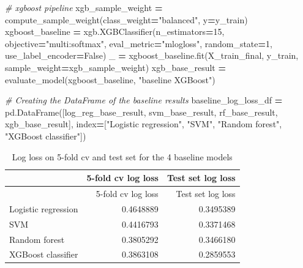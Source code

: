 \documentclass[a4paper, oneside]{report}
\newenvironment{Shaded}{\begin{snugshade}}{\end{snugshade}}
\newcommand{\AttributeTok}[1]{\textcolor[rgb]{0.77,0.63,0.00}{#1}}
\newcommand{\CommentTok}[1]{\textcolor[rgb]{0.56,0.35,0.01}{\textit{#1}}}
\newcommand{\DecValTok}[1]{\textcolor[rgb]{0.00,0.00,0.81}{#1}}
\newcommand{\FunctionTok}[1]{\textcolor[rgb]{0.00,0.00,0.00}{#1}}
\newcommand{\NormalTok}[1]{#1}
\newcommand{\OperatorTok}[1]{\textcolor[rgb]{0.81,0.36,0.00}{\textbf{#1}}}
\newcommand{\SpecialCharTok}[1]{\textcolor[rgb]{0.00,0.00,0.00}{#1}}
\newcommand{\StringTok}[1]{\textcolor[rgb]{0.31,0.60,0.02}{#1}}
\newcommand{\VariableTok}[1]{\textcolor[rgb]{0.00,0.00,0.00}{#1}}
\renewenvironment{Shaded}
{
  \vspace{4pt}%
  \begin{snugshade}%
}{%
  \end{snugshade}%
  \vspace{4pt}%
}
\begin{document}
\begin{Shaded}
\begin{Highlighting}[]
\CommentTok{\# xgboost pipeline}
\NormalTok{xgb\_sample\_weight }\OperatorTok{=}\NormalTok{ compute\_sample\_weight(class\_weight}\OperatorTok{=}\StringTok{"balanced"}\NormalTok{, y}\OperatorTok{=}\NormalTok{y\_train)}
\NormalTok{xgboost\_baseline }\OperatorTok{=}\NormalTok{ xgb.XGBClassifier(n\_estimators}\OperatorTok{=}\DecValTok{15}\NormalTok{,}
\NormalTok{                                     objective}\OperatorTok{=}\StringTok{"multi:softmax"}\NormalTok{,}
\NormalTok{                                     eval\_metric}\OperatorTok{=}\StringTok{"mlogloss"}\NormalTok{,}
\NormalTok{                                     random\_state}\OperatorTok{=}\DecValTok{1}\NormalTok{, }
\NormalTok{                                     use\_label\_encoder}\OperatorTok{=}\VariableTok{False}\NormalTok{)}
\NormalTok{\_ }\OperatorTok{=}\NormalTok{ xgboost\_baseline.fit(X\_train\_final, }
\NormalTok{                         y\_train, }
\NormalTok{                         sample\_weight}\OperatorTok{=}\NormalTok{xgb\_sample\_weight)}
\NormalTok{xgb\_base\_result }\OperatorTok{=}\NormalTok{ evaluate\_model(xgboost\_baseline, }\StringTok{"baseline XGBoost"}\NormalTok{)}

\CommentTok{\# Creating the DataFrame of the baseline results}
\NormalTok{baseline\_log\_loss\_df }\OperatorTok{=}\NormalTok{ pd.DataFrame([log\_reg\_base\_result, svm\_base\_result, rf\_base\_result, xgb\_base\_result], index}\OperatorTok{=}\NormalTok{[}\StringTok{"Logistic regression"}\NormalTok{, }\StringTok{"SVM"}\NormalTok{, }\StringTok{"Random forest"}\NormalTok{, }\StringTok{"XGBoost classifier"}\NormalTok{])}
\end{Highlighting}
\end{Shaded}

\begin{Shaded}
\end{Shaded}

\begin{longtable}[]{@{}lrr@{}}
\caption{Log loss on 5-fold cv and test set for the 4 baseline
models}\tabularnewline
\toprule
& 5-fold cv log loss & Test set log loss \\
\midrule
\endfirsthead
\toprule
& 5-fold cv log loss & Test set log loss \\
\midrule
\endhead
Logistic regression & 0.4648889 & 0.3495389 \\
SVM & 0.4416793 & 0.3371468 \\
Random forest & 0.3805292 & 0.3466180 \\
XGBoost classifier & 0.3863108 & 0.2859553 \\
\bottomrule
\end{longtable}
\end{document}
